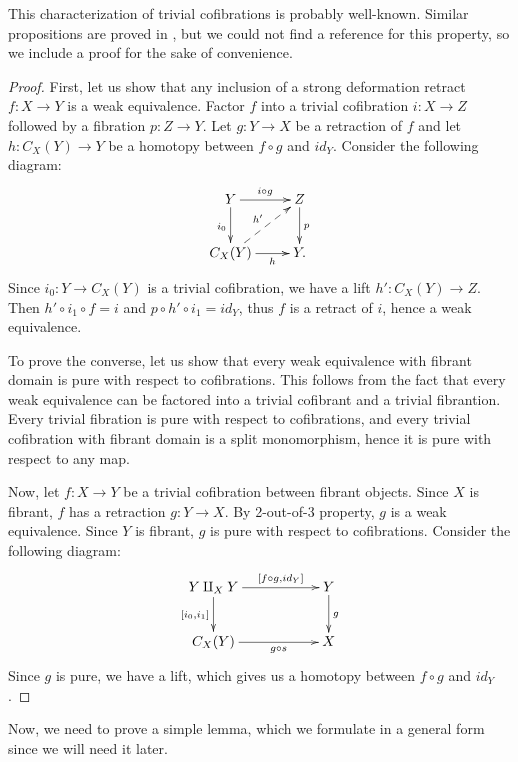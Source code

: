 \documentclass{amsart}
\theoremstyle{definition}
\newcommand{\cyli}{i}
\begin{document}
This characterization of trivial cofibrations is probably well-known.
Similar propositions are proved in \cite{hirschhorn}, but we could not find a reference for this property, so we include a proof for the sake of convenience.

\begin{proof}
First, let us show that any inclusion of a strong deformation retract $f : X \to Y$ is a weak equivalence.
Factor $f$ into a trivial cofibration $i : X \to Z$ followed by a fibration $p : Z \to Y$.
Let $g : Y \to X$ be a retraction of $f$ and let $h : C_X(Y) \to Y$ be a homotopy between $f \circ g$ and $id_Y$.
Consider the following diagram:
\[ \xymatrix{ Y \ar[r]^{i \circ g} \ar[d]_{\cyli_0} & Z \ar[d]^p \\
              C_X(Y) \ar[r]_-h \ar@{-->}[ur]^{h'}   & Y.
            } \]
Since $\cyli_0 : Y \to C_X(Y)$ is a trivial cofibration, we have a lift $h' : C_X(Y) \to Z$.
Then $h' \circ \cyli_1 \circ f = i$ and $p \circ h' \circ \cyli_1 = id_Y$, thus $f$ is a retract of $i$, hence a weak equivalence.

To prove the converse, let us show that every weak equivalence with fibrant domain is pure with respect to cofibrations.
This follows from the fact that every weak equivalence can be factored into a trivial cofibrant and a trivial fibrantion.
Every trivial fibration is pure with respect to cofibrations, and every trivial cofibration with fibrant domain is a split monomorphism,
hence it is pure with respect to any map.

Now, let $f : X \to Y$ be a trivial cofibration between fibrant objects.
Since $X$ is fibrant, $f$ has a retraction $g : Y \to X$.
By 2-out-of-3 property, $g$ is a weak equivalence.
Since $Y$ is fibrant, $g$ is pure with respect to cofibrations.
Consider the following diagram:
\[ \xymatrix{ Y \amalg_X Y \ar[rr]^-{[f \circ g, id_Y]} \ar[d]_{[\cyli_0,\cyli_1]} & & Y \ar[d]^g \\
              C_X(Y) \ar[rr]_-{g \circ s} & & X
            } \]
Since $g$ is pure, we have a lift, which gives us a homotopy between $f \circ g$ and $id_Y$.
\end{proof}

Now, we need to prove a simple lemma, which we formulate in a general form since we will need it later.
\end{document}
